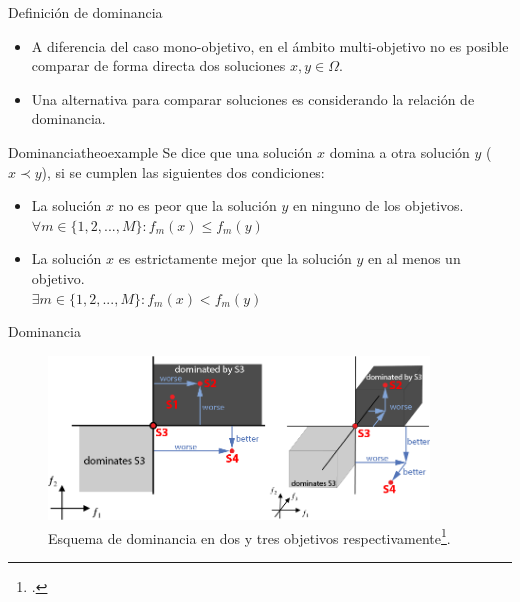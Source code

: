 \documentclass{beamer}
\begin{document}
\begin{frame}{Definición de dominancia}
\justifying
\begin{itemize}
\justifying
    \item A diferencia del caso mono-objetivo, en el ámbito multi-objetivo no es posible comparar de forma directa dos soluciones $x, y \in \Omega$.
    \item Una alternativa para comparar soluciones es considerando la relación de dominancia.
\end{itemize}

\begin{mydef}{Dominancia}{theoexample}
\scriptsize
Se dice que una solución $x$ domina a otra solución $y$ ($x \prec y$), si se cumplen las siguientes dos condiciones:
    \begin{itemize}
        \item La solución $x$ no es peor que la solución $y$ en ninguno de los objetivos.\\
$\forall m \in \{ 1, 2, ..., M \}: f_m(x) \leq f_m(y)$
\justifying
        \item La solución $x$ es estrictamente mejor que la solución $y$ en al menos un objetivo.\\
$\exists m \in \{ 1, 2, ..., M \}: f_m(x) < f_m(y)$
    \end{itemize}
\end{mydef}
\end{frame}

\begin{frame}{Dominancia}
\begin{figure}[H]
\centering
\includegraphics[width=0.9\textwidth]{dominance_scheme.png}
\caption{\scriptsize Esquema de dominancia en dos y tres objetivos respectivamente\footcite{WinNT}.}
\end{figure}
\end{frame}
\end{document}
